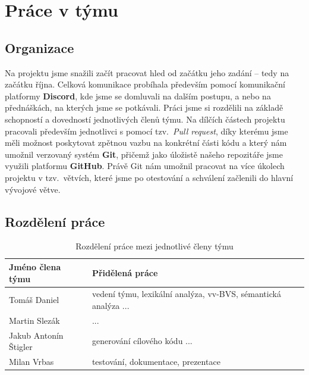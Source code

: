 \documentclass[a4paper, 12pt]{article} %
\begin{document}
    \newpage
    \section{Práce v týmu}
        \subsection{Organizace}
            Na projektu jsme snažili začít pracovat hled od začátku jeho zadání -- tedy
            na začátku října. Celková komunikace probíhala především pomocí komunikační
            platformy \textbf{Discord}, kde jsme se domluvali na dalším postupu, a nebo 
            na přednáškách, na kterých jsme se potkávali. Práci jsme si rozdělili na 
            základě schopností a dovedností jednotlivých členů týmu. Na dílčích částech
            projektu pracovali především jednotlivci s pomocí tzv.\ \textit{Pull request}, 
            díky kterému jsme měli možnost poskytovat zpětnou vazbu na konkrétní části kódu 
            a který nám umožnil verzovaný systém \textbf{Git}, přičemž jako úložistě 
            našeho repozitáře jsme využili platformu \textbf{GitHub}. Právě Git nám umožnil
            pracovat na více úkolech projektu v tzv.\ větvích, které jsme po otestování a 
            schválení začlenili do hlavní vývojové větve.

        \subsection{Rozdělení práce}            
            \begin{table}[h]
                \centering
                \begin{tabular}{| l | l |}
                    \hline
                    \textbf{Jméno člena týmu} & \textbf{Přidělená práce} \\
                    \hline
                    Tomáš Daniel            &  vedení týmu, lexikální analýza, vv-BVS, sémantická analýza ...\\
                    Martin Slezák           &  ...\\
                    Jakub Antonín Štigler   &  generování cílového kódu ...\\
                    Milan Vrbas             & testování, dokumentace, prezentace \\
                    \hline
                \end{tabular}
                \caption{Rozdělení práce mezi jednotlivé členy týmu}
            \end{table}
\end{document}
